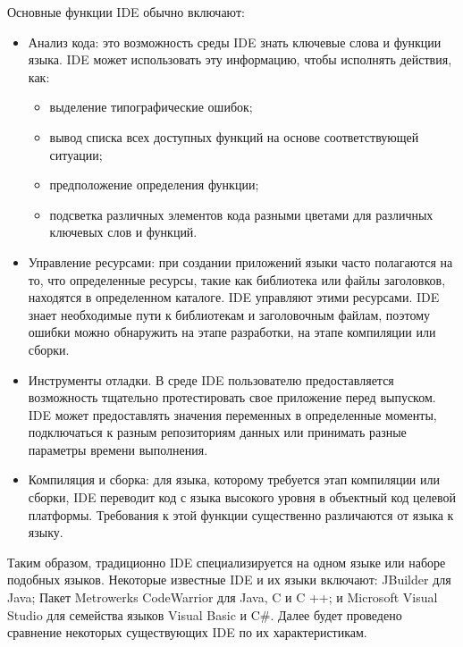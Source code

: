 Основные функции IDE обычно включают:\\
\begin{itemize}
    \item Анализ кода: это возможность среды IDE знать ключевые слова и функции языка. IDE может
        использовать эту информацию, чтобы исполнять действия, как:\\
        \begin{itemize}
            \item выделение типографические ошибок;\\
            \item вывод списка всех доступных функций на основе соответствующей ситуации;\\
            \item предположение определения функции;\\
            \item подсветка различных элементов кода разными цветами для различных ключевых слов 
                и функций.\\
        \end{itemize}
    \item Управление ресурсами: при создании приложений языки часто полагаются на то, что 
        определенные ресурсы, такие как библиотека или файлы заголовков, находятся в определенном 
        каталоге. IDE управляют этими ресурсами. IDE знает необходимые пути к библиотекам и 
        заголовочным файлам, поэтому ошибки можно обнаружить на этапе разработки, на этапе 
        компиляции или сборки.\\
    \item Инструменты отладки. В среде IDE пользователю предоставляется возможность тщательно
        протестировать свое приложение перед выпуском. IDE может предоставлять значения переменных 
        в определенные моменты, подключаться к разным репозиториям данных или принимать разные 
        параметры времени выполнения.\\
    \item Компиляция и сборка: для языка, которому требуется этап компиляции или сборки, IDE 
        переводит код с языка высокого уровня в объектный код целевой платформы. Требования к этой 
        функции существенно различаются от языка к языку.\\
\end{itemize}

Таким образом, традиционно IDE специализируется на одном языке или наборе подобных языков. 
Некоторые известные IDE и их языки включают: JBuilder для Java; Пакет Metrowerks CodeWarrior для 
Java, C и C ++; и Microsoft Visual Studio для семейства языков Visual Basic и C#.
Далее будет проведено сравнение некоторых существующих IDE по их характеристикам.\\

